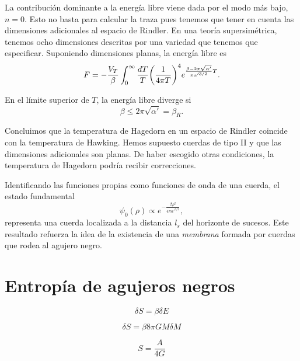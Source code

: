 La contribución dominante a la energía libre viene dada por el modo más bajo, $n=0$.
Esto no basta para calcular la traza pues tenemos que tener en cuenta las dimensiones adicionales al espacio de Rindler. 
En una teoría supersimétrica, tenemos ocho dimensiones descritas por una variedad que tenemos que especificar.
Suponiendo dimensiones planas, la energía libre es
\begin{equation}
  F= -\frac{V_T}{\beta}\int_0^\infty \frac{dT}{T}\qty(\frac{1}{4\pi T})^4 e^{\frac{\beta-2\pi\sqrt{\alpha'}}{\pi\alpha'^{3/2}}T}.
\end{equation}

En el límite superior de $T$, la energía libre diverge si
\begin{equation}
  \beta \leq 2\pi\sqrt{\alpha'}=\beta_R.
\end{equation}

Concluimos que la temperatura de Hagedorn en un espacio de Rindler coincide con la temperatura
de Hawking.
Hemos supuesto cuerdas de tipo II y que las dimensiones adicionales son planas.
De haber escogido otras condiciones, la temperatura de Hagedorn podría recibir correcciones.

Identificando las funciones propias como funciones de onda de una cuerda, el estado fundamental
\begin{equation}
  \psi_0(\rho)\propto e^{-\frac{\beta \rho^2}{4\pi\alpha'^{3/2}} },
\end{equation}
representa una cuerda localizada a la distancia $l_s$ del horizonte de sucesos.
Este resultado refuerza la idea de la existencia de una \emph{membrana} formada por cuerdas
que rodea al agujero negro.


\section{Entropía de agujeros negros}

\begin{equation}
  \delta S = \beta \delta E
\end{equation}

\begin{equation}
  \delta S = \beta 8\pi GM\delta M
\end{equation}

\begin{equation}
  S=\frac{A}{4G}
\end{equation}

